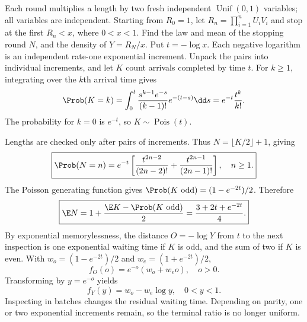 Each round multiplies a length by two fresh independent $\operatorname{Unif}(0,1)$ variables; all variables are independent. Starting from $R_0=1$, let $R_n=\prod_{i=1}^nU_iV_i$ and stop at the first $R_n<x$, where $0<x<1$. Find the law and mean of the stopping round $N$, and the density of $Y=R_N/x$.
\solution Put $t=-\log x$. Each negative logarithm is an independent rate-one exponential increment. Unpack the pairs into individual increments, and let $K$ count arrivals completed by time $t$. For $k\ge1$, integrating over the $k$th arrival time gives
\[
\Prob(K=k)=\int_0^t\frac{s^{k-1}e^{-s}}{(k-1)!}e^{-(t-s)}\dd s
=e^{-t}\frac{t^k}{k!}.
\]
The probability for $k=0$ is $e^{-t}$, so $K\sim\operatorname{Pois}(t)$.

Lengths are checked only after pairs of increments. Thus $N=\lfloor K/2\rfloor+1$, giving
\[
\boxed{\Prob(N=n)=e^{-t}\left[\frac{t^{2n-2}}{(2n-2)!}
+\frac{t^{2n-1}}{(2n-1)!}\right],\quad n\ge1.}
\]
The Poisson generating function gives $\Prob(K\text{ odd})=(1-e^{-2t})/2$. Therefore
\[
\boxed{\E N=1+\frac{\E K-\Prob(K\text{ odd})}{2}
=\frac{3+2t+e^{-2t}}4.}
\]
By exponential memorylessness, the distance $O=-\log Y$ from $t$ to the next inspection is one exponential waiting time if $K$ is odd, and the sum of two if $K$ is even. With $w_o=(1-e^{-2t})/2$ and $w_e=(1+e^{-2t})/2$,
\[
f_O(o)=e^{-o}(w_o+w_eo),\quad o>0.
\]
Transforming by $y=e^{-o}$ yields
\[
\boxed{f_Y(y)=w_o-w_e\log y,\quad0<y<1.}
\]
\insight Inspecting in batches changes the residual waiting time. Depending on parity, one or two exponential increments remain, so the terminal ratio is no longer uniform.

